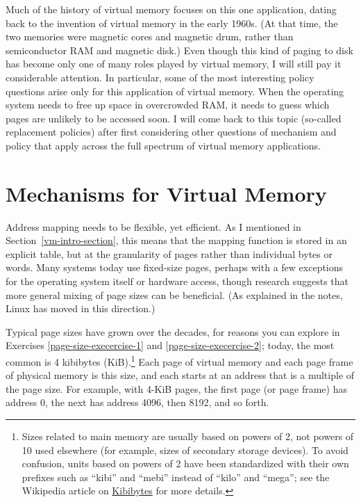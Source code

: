 Much of the history of virtual memory focuses on this one application,
dating back to the invention of virtual memory in the early 1960s.
(At that time, the two memories were magnetic cores and magnetic drum,
rather than semiconductor RAM and magnetic disk.)  Even though this
kind of paging to disk has become only one of many roles played by
virtual memory, I will still pay it considerable attention.  In particular,
some of the most interesting policy questions arise only for this
application of virtual memory.  When the operating system needs to
free up space in overcrowded RAM, it needs to guess which pages are
unlikely to be accessed soon. I will come back to this topic
(so-called replacement policies) after first considering other
questions of mechanism and policy that apply across the full spectrum
of virtual memory applications.

\section{Mechanisms for Virtual Memory}
\label{vm-reps}

Address mapping needs to be flexible, yet efficient. As I mentioned
in Section~\ref{vm-intro-section}, this means that the mapping function is stored in an explicit
table, but at the granularity of pages rather than individual bytes or
words.  Many systems today use fixed-size pages, perhaps with a few
exceptions for the operating system itself or hardware access, though
research suggests that more general mixing of page sizes can be
beneficial.  (As explained in the notes, Linux has moved in this direction.)

Typical page sizes have grown over the decades, for reasons you can
explore in Exercises \ref{page-size-execercise-1} and \ref{page-size-execercise-2}; today, the most common
is 4 kibibytes (KiB).\footnote{\label{kibibyte}Sizes related to main memory are usually
  based on powers of 2, not powers of 10 used
  elsewhere (for example, sizes of secondary storage devices).  To
  avoid confusion, units based on powers of 2 have been standardized
  with their own prefixes such as ``kibi'' and ``mebi'' instead of
  ``kilo'' and ``mega''; see the Wikipedia article on
  {\href{https://en.wikipedia.org/wiki/Kibibyte}{Kibibytes}}
  for more details.}
Each page of virtual memory and each page frame of physical
memory is this size, and each starts at an address that is a multiple
of the page size.  For example, with 4-KiB pages, the first page (or
page frame) has address 0, the next has address 4096, then 8192, and
so forth.

